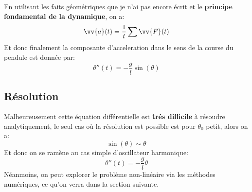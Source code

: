 \documentclass{report}
\begin{document}
      \pagebreak
      En utilisant les faits géométriques que je n'ai pas encore écrit et le \textbf{principe fondamental de la dynamique}, on a:
      \[
         \vv{a}(t) = \frac{1}{t}\sum\vv{F}(t)
      \]
      Et donc finalement la composante d'acceleration dans le sens de la course du pendule est donnée par:
      \[
         \boxed{\theta''(t) = - \frac{g}{l}\sin(\theta)}
      \]
      \subsection{Résolution}
      Malheureusement cette équation différentielle est \textbf{trés difficile} à résoudre analytiquement, le seul cas où la résolution est possible est pour \(\theta_0\) petit, alors on a:
      \[
         \sin(\theta) \sim \theta
      \]
      Et donc on se ramène au cas simple d'oscillateur harmonique:
      \[
         \theta''(t) = -\frac{g}{l}\theta
      \]
      Néanmoins, on peut explorer le problème non-linéaire via les méthodes numériques, ce qu'on verra dans la section suivante.
\end{document}
